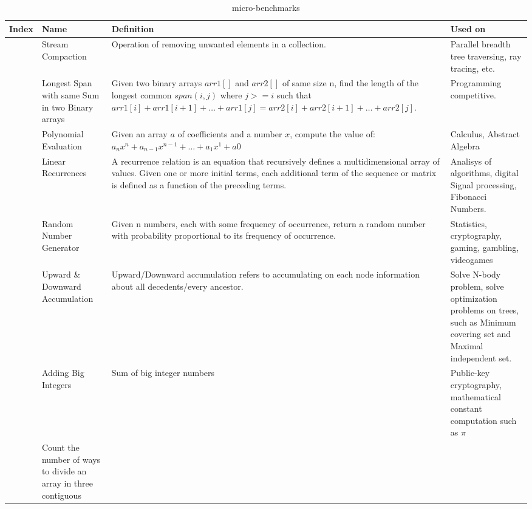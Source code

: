 \documentclass[Ingles]{ic-tese-v1}
\begin{document}
\begin{table}[!t]
	\centering
	\caption[small]{micro-benchmarks}
	\begin{adjustbox}{max width=1.1\textwidth, center}
		\begin{tabular}{|>{\centering\arraybackslash}p{0.8cm}|p{5cm}|p{9cm}|p{5cm}|} \hline
			Index  & Name & Definition & Used  on \\ \hline
			1 & Stream  Compaction
			& Operation of removing unwanted elements in  a collection.
			& Parallel breadth tree  traversing, ray tracing, etc.\\ \hline
			2  & Longest Span with same Sum in two Binary arrays
			& Given two binary arrays $arr1[]$ and $arr2[]$ of same size n, find the
			length of the longest common $span (i, j)$ where $j >= i$ such that
			$arr1[i] + arr1[i+1] + \dotso + arr1[j] = arr2[i] + arr2[i+1] + \dotso +
			arr2[j]$. 
			& Programming competitive.\\ \hline
			3 & Polynomial Evaluation 
			& Given an array $a$ of coefficients and a number  $x$,   compute  the   value  of:
			$a_nx^n  + a_{n-1}x^{n-1}  + \dotso  +  a_1x^1 + a0$
			& Calculus,  Abstract  Algebra\\ \hline
			4 & Linear Recurrences
			& A recurrence relation is an equation that
			recursively  defines  a  multidimensional
			array  of  values.   Given  one  or  more
			initial  terms, each  additional term  of
			the sequence  or matrix  is defined  as a
			function   of   the   preceding   terms.  
			& Analisys  of  algorithms,  digital Signal  processing,  Fibonacci Numbers.\\ \hline
			5  & Random  Number Generator
			& Given  n numbers,  each with  some
			frequency  of  occurrence, return  a
			random  number  with  probability
			proportional to its
			frequency of occurrence.
			& Statistics, cryptography, gaming, gambling, videogames\\ \hline
			6   & Upward \&  Downward Accumulation
			& Upward/Downward accumulation refers  to   accumulating  on
			each node  information about all decedents/every ancestor.
			& Solve  N-body  problem,  solve    optimization  problems
			on  trees, such as Minimum   covering   set  and  Maximal
			independent set.\\ \hline
			7   & Adding Big Integers
			&  Sum of big integer numbers
			& Public-key  cryptography,  mathematical  constant computation  such as $\pi$ \\ \hline
			8   & Count the number of ways to divide an array in three contiguous

\end{tabular}
\end{adjustbox}
\end{table}
\end{document}
